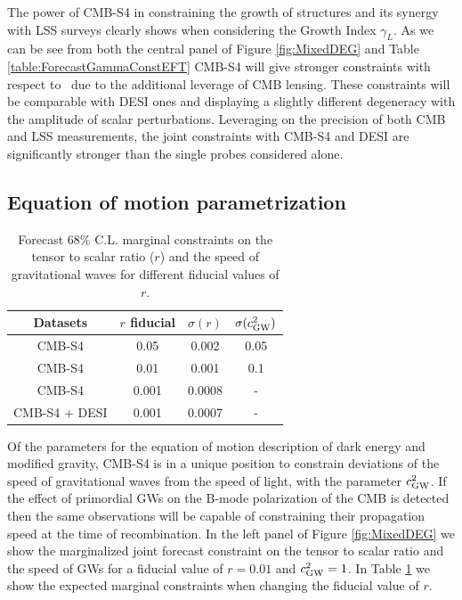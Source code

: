 The power of CMB-S4 in constraining the growth of structures and its synergy with LSS surveys clearly shows when considering the Growth Index $\gamma_{L}$. As we can be see from both the central panel of Figure \ref{fig:MixedDEG} and Table \ref{table:ForecastGammaConstEFT} CMB-S4 will give stronger constraints with respect to \planck\ due to the additional leverage of CMB lensing. These constraints will be comparable with DESI ones and displaying a slightly different degeneracy with the amplitude of scalar perturbations.
Leveraging on the precision of both CMB and LSS measurements, the joint constraints with CMB-S4 and DESI are significantly stronger than the single probes considered alone.

\subsection{Equation of motion parametrization}

\begin{table}[t!]
\begin{center}
\begin{tabular}{|c|c|c|c|} 
\hline
Datasets 			&  $r$ fiducial & $\sigma ( r )$  & $\sigma ( c_{\rm GW}^2 )$ \\
\hline
\hline
CMB-S4               & 0.05 & 0.002 & 0.05 \\
\hline
CMB-S4               & 0.01 & 0.001 & 0.1 \\
\hline
CMB-S4               & 0.001 & 0.0008 & - \\
\hline
CMB-S4 + DESI     & 0.001 & 0.0007 & - \\
\hline
\end{tabular}
\caption{Forecast $68\%$ C.L. marginal constraints on the tensor to scalar ratio ($r$) and the speed of gravitational waves for different fiducial values of $r$.}
\label{table:ForecastCT}
\end{center}
\end{table}
Of the parameters for the equation of motion description of dark energy and modified gravity,  CMB-S4 is in a unique position to 
constrain deviations of the speed of gravitational waves from the speed of light, with the parameter $c^2_{\rm GW}$. If the effect of primordial GWs on the B-mode polarization of the CMB is detected then the same observations will be capable of constraining their propagation speed at the time of recombination.
In the left panel of Figure \ref{fig:MixedDEG} we show the marginalized joint forecast constraint on the tensor to scalar ratio and the speed of GWs for a fiducial value of $r=0.01$ and $c_{\rm GW}^2=1$. In Table \ref{table:ForecastCT} we show the expected marginal constraints when changing the fiducial value of $r$.

